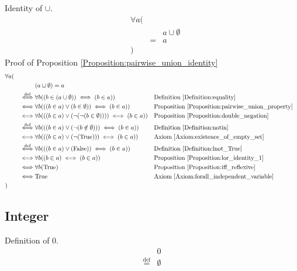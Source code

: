 \begin{prop}
\label{Proposition:pairwise_union_identity}
Identity of $\cup$.
\begin{align*}
& \forall a ( \\
& & & a \cup \emptyset \\
& & = & a \\
& )
\end{align*}
Proof of Proposition \ref{Proposition:pairwise_union_identity}
\begin{align*}
& \forall a ( \\
& & & (a \cup \emptyset) = a \\
& & \overset{\operatorname{def}}{\iff} & \forall b ((b \in (a \cup \emptyset)) \iff (b \in a))
& & \text{Definition \ref{Definition:equality}} \\
& & \iff & \forall b (((b \in a) \lor (b \in \emptyset)) \iff (b \in a))
& & \text{Proposition \ref{Proposition:pairwise_union_property}} \\
& & \iff & \forall b (((b \in a) \lor (\lnot (\lnot (b \in \emptyset)))) \iff (b \in a))
& & \text{Proposition \ref{Proposition:double_negation}} \\
& & \overset{\operatorname{def}}{\iff} & \forall b (((b \in a) \lor (\lnot (b \notin \emptyset))) \iff (b \in a))
& & \text{Definition \ref{Definition:notin}} \\
& & \iff & \forall b (((b \in a) \lor (\lnot (\text{True}))) \iff (b \in a))
& & \text{Axiom \ref{Axiom:existence_of_empty_set}} \\
& & \overset{\operatorname{def}}{\iff} & \forall b (((b \in a) \lor (\text{False})) \iff (b \in a))
& & \text{Definition \ref{Definition:lnot_True}} \\
& & \iff & \forall b ((b \in a) \iff (b \in a))
& & \text{Proposition \ref{Proposition:lor_identity_1}} \\
& & \iff & \forall b (\text{True})
& & \text{Proposition \ref{Proposition:iff_reflexive}} \\
& & \iff & \text{True}
& & \text{Axiom \ref{Axiom:forall_independent_variable}} \\
& )
\end{align*}
\end{prop}

\subsection{Integer}
\begin{defn}
\label{Definition:zero}
Definition of 0.
\begin{align*}
& 0 \\
\overset{\operatorname{def}}{=} & \emptyset
\end{align*}
\end{defn}

